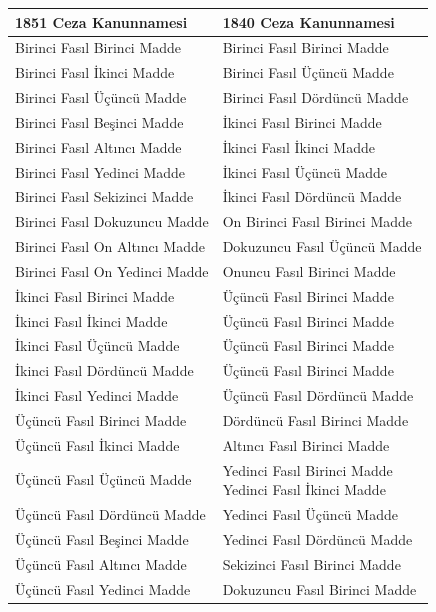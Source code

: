 \begin{table}[htbp]
\centering
\begin{tabular}{ |l|l| }
\hline
\textbf{1851 Ceza Kanunnamesi} & \textbf{1840 Ceza Kanunnamesi} \\
\hline
Birinci Fasıl Birinci Madde & Birinci Fasıl Birinci Madde \\
\hline
Birinci Fasıl İkinci Madde & Birinci Fasıl Üçüncü Madde \\
\hline
Birinci Fasıl Üçüncü Madde & Birinci Fasıl Dördüncü Madde \\
\hline
Birinci Fasıl Beşinci Madde & İkinci Fasıl Birinci Madde \\
\hline
Birinci Fasıl Altıncı Madde & İkinci Fasıl İkinci Madde \\
\hline
Birinci Fasıl Yedinci Madde & İkinci Fasıl Üçüncü Madde \\
\hline
Birinci Fasıl Sekizinci Madde & İkinci Fasıl Dördüncü Madde \\
\hline
Birinci Fasıl Dokuzuncu Madde & On Birinci Fasıl Birinci Madde \\
\hline
Birinci Fasıl On Altıncı Madde & Dokuzuncu Fasıl Üçüncü Madde \\
\hline
Birinci Fasıl On Yedinci Madde & Onuncu Fasıl Birinci Madde \\
\hline
İkinci Fasıl Birinci Madde & Üçüncü Fasıl Birinci Madde \\
\hline
İkinci Fasıl İkinci Madde & Üçüncü Fasıl Birinci Madde \\
\hline
İkinci Fasıl Üçüncü Madde & Üçüncü Fasıl Birinci Madde \\
\hline
İkinci Fasıl Dördüncü Madde & Üçüncü Fasıl Birinci Madde \\
\hline
İkinci Fasıl Yedinci Madde & Üçüncü Fasıl Dördüncü Madde \\
\hline
Üçüncü Fasıl Birinci Madde & Dördüncü Fasıl Birinci Madde \\
\hline
Üçüncü Fasıl İkinci Madde & Altıncı Fasıl Birinci Madde \\
\hline
Üçüncü Fasıl Üçüncü Madde & \makecell[l]{Yedinci Fasıl Birinci Madde\\Yedinci Fasıl İkinci Madde} \\
\hline
Üçüncü Fasıl Dördüncü Madde & Yedinci Fasıl Üçüncü Madde \\
\hline
Üçüncü Fasıl Beşinci Madde & Yedinci Fasıl Dördüncü Madde \\
\hline
Üçüncü Fasıl Altıncı Madde & Sekizinci Fasıl Birinci Madde \\
\hline
Üçüncü Fasıl Yedinci Madde & Dokuzuncu Fasıl Birinci Madde \\

\end{tabular}
\end{table}
